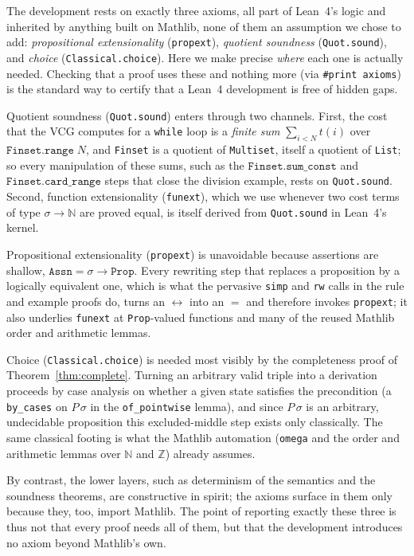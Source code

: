\documentclass[runningheads]{llncs}
\newcommand{\Lean}{Lean~4\xspace}
\newcommand{\State}{\sigma}
\newcommand{\Nat}{\mathbb{N}}
\newcommand{\Int}{\mathbb{Z}}
\newcommand{\code}[1]{\texttt{#1}}
\begin{document}
The development rests on exactly three axioms, all part of \Lean{}'s logic and
inherited by anything built on Mathlib, none of them an assumption we chose to
add: \emph{propositional extensionality} (\code{propext}), \emph{quotient
soundness} (\code{Quot.sound}), and \emph{choice} (\code{Classical.choice}).
Here we make precise \emph{where} each one is actually needed.
Checking that a proof uses these and nothing more (via \code{\#print axioms}) is
the standard way to certify that a \Lean{} development is free of hidden gaps.

Quotient soundness (\code{Quot.sound}) enters through two channels.
First, the cost that the VCG computes for a \code{while} loop is a
\emph{finite sum} $\sum_{i < N} t(i)$ over $\code{Finset.range}\;N$, and
\code{Finset} is a quotient of \code{Multiset}, itself a quotient of
\code{List}; so every manipulation of these sums, such as the
$\code{Finset.sum\_const}$ and $\code{Finset.card\_range}$ steps that close the
division example, rests on \code{Quot.sound}.
Second, function extensionality (\code{funext}), which we use whenever two cost
terms of type $\State \to \Nat$ are proved equal, is itself derived from
\code{Quot.sound} in \Lean{}'s kernel.

Propositional extensionality (\code{propext}) is unavoidable because assertions
are shallow, $\code{Assn} = \State \to \code{Prop}$.
Every rewriting step that replaces a proposition by a logically equivalent one,
which is what the pervasive \code{simp} and \code{rw} calls in the rule and
example proofs do, turns an $\leftrightarrow$ into an $=$ and therefore invokes
\code{propext}; it also underlies \code{funext} at \code{Prop}-valued functions
and many of the reused Mathlib order and arithmetic lemmas.

Choice (\code{Classical.choice}) is needed most visibly by the completeness
proof of Theorem~\ref{thm:complete}.
Turning an arbitrary valid triple into a derivation proceeds by case analysis on
whether a given state satisfies the precondition (a \code{by\_cases}
on $P\,\State$
in the \code{of\_pointwise} lemma), and since $P\,\State$ is an arbitrary,
undecidable proposition this excluded-middle step exists only classically.
The same classical footing is what the Mathlib automation (\code{omega} and the
order and arithmetic lemmas over $\Nat$ and $\Int$) already assumes.

By contrast, the lower layers, such as determinism of the semantics
and the soundness theorems, are constructive in
spirit; the axioms surface in them only because they, too, import Mathlib.
The point of reporting exactly these three is thus not that every proof needs
all of them, but that the development introduces no axiom beyond Mathlib's own.
\end{document}
